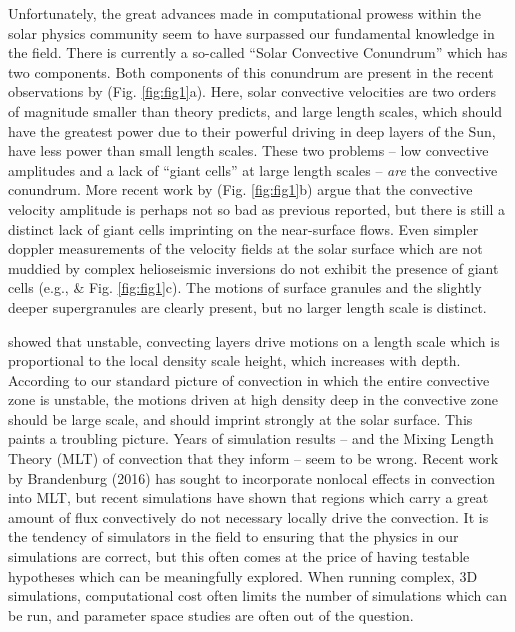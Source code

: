 \documentclass[aasms,12pt]{article}
\begin{document}
Unfortunately, the great advances made in computational prowess within the solar physics
community seem to have surpassed our fundamental knowledge in the field. There is currently
a so-called ``Solar Convective Conundrum'' which has two components.  Both components of
this conundrum are present in the recent observations
by \cite{hanasoge&all2012} (Fig. \ref{fig:fig1}a).  Here, solar convective velocities are
two orders of magnitude smaller than theory predicts, and large length scales, which should
have the greatest power due to their powerful driving in deep layers of the Sun,
have less power than small length scales.  These two problems -- low convective amplitudes
and a lack of ``giant cells'' at large length scales -- \emph{are} the convective conundrum.
More recent work by \cite{greer&all2015} (Fig. \ref{fig:fig1}b) argue that the convective
velocity amplitude is perhaps not so bad as previous reported, but there is still a distinct
lack of giant cells imprinting on the near-surface flows.
Even simpler doppler measurements of the velocity fields at the solar surface which are not muddied
by complex helioseismic inversions do not exhibit the presence
of giant cells (e.g., \cite{hathaway&all2015} \& Fig. \ref{fig:fig1}c).  
The motions of surface granules and the slightly deeper supergranules are clearly present, but no
larger length scale is distinct.

\cite{lord&all2014} showed that unstable, convecting layers drive motions on a length scale which is proportional to
the local density scale height, which increases with depth.  According to our standard picture of convection
in which the entire convective zone is unstable, the motions driven at high density deep in the convective
zone should be large scale, and should imprint strongly at the solar surface.
This paints a troubling picture.  Years of simulation results -- and the Mixing Length
Theory (MLT) of convection that they inform -- seem to be wrong.  Recent work by
Brandenburg (2016) \cite{brandenburg2016} has sought to incorporate nonlocal effects in
convection into MLT, but recent simulations \cite{kapyla&all2017} have shown that regions which
carry a great amount of flux convectively do not necessary locally drive the convection.
It is the tendency of simulators in the field to ensuring that the physics in our simulations are 
correct, but this often comes at the price of having testable hypotheses which can be meaningfully
explored. When running complex, 3D simulations, 
computational cost often limits the number of simulations which can be
run, and parameter space studies are often out of the question.  
\end{document}
